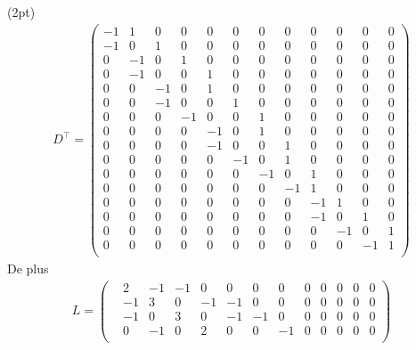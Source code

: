 \documentclass[a4paper,11pt,twoside]{exam}
\begin{document}
\begin{exercice}
\begin{enumerate}[resume,label=\Roman{numeroexo} - \arabic*.]
    \begin{solution}(2pt)
    {\small
    \setcounter{MaxMatrixCols}{20}
    \begin{align*}
    D^\top =
        \begin{pmatrix}
        -1 &  1 &  0 &  0 &  0 &  0 &  0 &  0 &  0 &  0 &  0 &  0 \\
        -1 &  0 &  1 &  0 &  0 &  0 &  0 &  0 &  0 &  0 &  0 &  0 \\
         0 & -1 &  0 &  1 &  0 &  0 &  0 &  0 &  0 &  0 &  0 &  0 \\
         0 & -1 &  0 &  0 &  1 &  0 &  0 &  0 &  0 &  0 &  0 &  0 \\
         0 &  0 & -1 &  0 &  1 &  0 &  0 &  0 &  0 &  0 &  0 &  0 \\
         0 &  0 & -1 &  0 &  0 &  1 &  0 &  0 &  0 &  0 &  0 &  0 \\
         0 &  0 &  0 & -1 &  0 &  0 &  1 &  0 &  0 &  0 &  0 &  0 \\
         0 &  0 &  0 &  0 & -1 &  0 &  1 &  0 &  0 &  0 &  0 &  0 \\
         0 &  0 &  0 &  0 & -1 &  0 &  0 &  1 &  0 &  0 &  0 &  0 \\
         0 &  0 &  0 &  0 &  0 & -1 &  0 &  1 &  0 &  0 &  0 &  0 \\
         0 &  0 &  0 &  0 &  0 &  0 & -1 &  0 &  1 &  0 &  0 &  0 \\
         0 &  0 &  0 &  0 &  0 &  0 &  0 & -1 &  1 &  0 &  0 &  0 \\
         0 &  0 &  0 &  0 &  0 &  0 &  0 &  0 & -1 &  1 &  0 &  0 \\
         0 &  0 &  0 &  0 &  0 &  0 &  0 &  0 & -1 &  0 &  1 &  0 \\
         0 &  0 &  0 &  0 &  0 &  0 &  0 &  0 &  0 & -1 &  0 &  1 \\
         0 &  0 &  0 &  0 &  0 &  0 &  0 &  0 &  0 &  0 & -1 &  1 \\
        \end{pmatrix}
    \end{align*}}
    De plus
    \begin{align*}
        L=
        \begin{pmatrix}
        & 2 & -1 & -1 &  0 &  0 &  0 &  0 &  0 &  0 &  0 &  0 &  0 \\
        &-1 &  3 &  0 & -1 & -1 &  0 &  0 &  0 &  0 &  0 &  0 &  0 \\
        &-1 &  0 &  3 &  0 & -1 & -1 &  0 &  0 &  0 &  0 &  0 &  0 \\
        & 0 & -1 &  0 &  2 &  0 &  0 & -1 &  0 &  0 &  0 &  0 &  0 \\

\end{pmatrix}
\end{align*}
\end{solution}
\end{enumerate}
\end{exercice}
\end{document}
